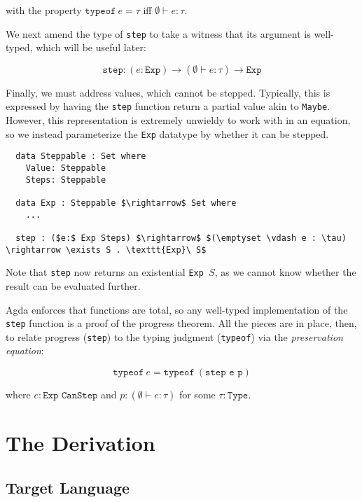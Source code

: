 \documentclass[manuscript,screen,review,sigplan]{acmart}
\begin{document}
with the property $\texttt{typeof}\ e = \tau$ iff $\emptyset \vdash e : \tau$.

We next amend the type of \texttt{step} to take a witness that its argument
is well-typed, which will be useful later:

\begin{equation*}
  \texttt{step} : (e: \texttt{Exp}) \rightarrow (\emptyset \vdash e : \tau)
    \rightarrow \texttt{Exp}
\end{equation*}

Finally, we must address values, which cannot be stepped. Typically, this is
expressed by having the \texttt{step} function return a partial value akin to
\texttt{Maybe}. However, this representation is extremely unwieldy to work with
in an equation, so we instead parameterize the \texttt{Exp} datatype by whether
it can be stepped.

\begin{lstlisting}
  data Steppable : Set where
    Value: Steppable
    Steps: Steppable

  data Exp : Steppable $\rightarrow$ Set where
    ...

  step : ($e:$ Exp Steps) $\rightarrow$ $(\emptyset \vdash e : \tau) \rightarrow \exists S . \texttt{Exp}\ S$
\end{lstlisting}

Note that \texttt{step} now returns an existential \texttt{Exp }$S$, as we
cannot know whether the result can be evaluated further.

Agda enforces that functions are total, so any well-typed implementation of the
\texttt{step} function is a proof of the progress theorem. All the pieces are
in place, then, to relate progress (\texttt{step}) to the typing judgment
(\texttt{typeof}) via the \emph{preservation equation}:

\begin{equation}\label{eq:preservation}
  \texttt{typeof}\ e = \texttt{typeof}\ (\texttt{step e p})
\end{equation}

where $e : \texttt{Exp CanStep}$ and $p : (\emptyset \vdash e : \tau)$ for some
$\tau : \texttt{Type}$.

\section{The Derivation}

\subsection{Target Language}
\end{document}
